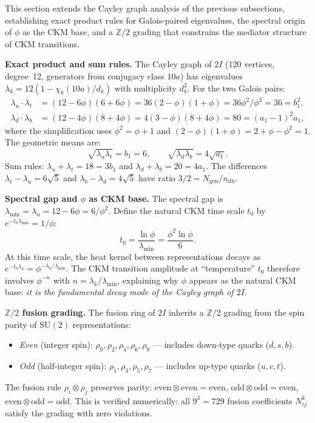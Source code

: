 \documentclass[12pt,a4paper]{article}
\theoremstyle{definition}
\begin{document}
This section extends the Cayley graph analysis of the previous subsections, establishing exact product rules for Galois-paired eigenvalues, the spectral origin of $\phi$ as the CKM base, and a $\mathbb{Z}/2$ grading that constrains the mediator structure of CKM transitions.

\textbf{Exact product and sum rules.}  The Cayley graph of $2I$ (120 vertices, degree~12, generators from conjugacy class $10a$) has eigenvalues $\lambda_k = 12(1 - \chi_k(10a)/d_k)$ with multiplicity $d_k^2$.  For the two Galois pairs:
\begin{align}
\lambda_u \cdot \lambda_t &= (12 - 6\phi)(6 + 6\phi) = 36(2 - \phi)(1 + \phi) = 36\phi^2 / \phi^2 = 36 = b_1^2, \label{eq:cayley_prod_ut} \\
\lambda_d \cdot \lambda_b &= (12 - 4\phi)(8 + 4\phi) = 4(3 - \phi)(8 + 4\phi) = 80 = (a_1 - 1)^2 a_1, \label{eq:cayley_prod_db}
\end{align}
where the simplification uses $\phi^2 = \phi + 1$ and $(2-\phi)(1+\phi) = 2 + \phi - \phi^2 = 1$.  The geometric means are:
\begin{equation}
\sqrt{\lambda_u \lambda_t} = b_1 = 6, \qquad
\sqrt{\lambda_d \lambda_b} = 4\sqrt{a_1}.
\end{equation}
Sum rules: $\lambda_u + \lambda_t = 18 = 3b_1$ and $\lambda_d + \lambda_b = 20 = 4a_1$.  The differences $\lambda_t - \lambda_u = 6\sqrt{5}$ and $\lambda_b - \lambda_d = 4\sqrt{5}$ have ratio $3/2 = N_{\text{gen}}/n_{\text{db}}$.

\textbf{Spectral gap and $\phi$ as CKM base.}  The spectral gap is $\lambda_{\min} = \lambda_u = 12 - 6\phi = 6/\phi^2$.  Define the natural CKM time scale $t_0$ by $e^{-t_0 \lambda_{\min}} = 1/\phi$:
\begin{equation}
t_0 = \frac{\ln\phi}{\lambda_{\min}} = \frac{\phi^2 \ln\phi}{6}.
\end{equation}
At this time scale, the heat kernel between representations decays as $e^{-t_0 \lambda_k} = \phi^{-\lambda_k/\lambda_{\min}}$.  The CKM transition amplitude at ``temperature'' $t_0$ therefore involves $\phi^{-n}$ with $n = \lambda_k / \lambda_{\min}$, explaining why $\phi$ appears as the natural CKM base: \emph{it is the fundamental decay mode of the Cayley graph of $2I$}.

\textbf{$\mathbb{Z}/2$ fusion grading.}  The fusion ring of $2I$ inherits a $\mathbb{Z}/2$ grading from the spin parity of $\mathrm{SU}(2)$ representations:
\begin{itemize}
\item \emph{Even} (integer spin): $\rho_0, \rho_2, \rho_4, \rho_6, \rho_8$ --- includes down-type quarks ($d, s, b$).
\item \emph{Odd} (half-integer spin): $\rho_1, \rho_3, \rho_5, \rho_7$ --- includes up-type quarks ($u, c, t$).
\end{itemize}
The fusion rule $\rho_i \otimes \rho_j$ preserves parity: $\mathrm{even} \otimes \mathrm{even} = \mathrm{even}$, $\mathrm{odd} \otimes \mathrm{odd} = \mathrm{even}$, $\mathrm{even} \otimes \mathrm{odd} = \mathrm{odd}$.  This is verified numerically: all $9^3 = 729$ fusion coefficients $N_{ij}^k$ satisfy the grading with zero violations.
\end{document}
